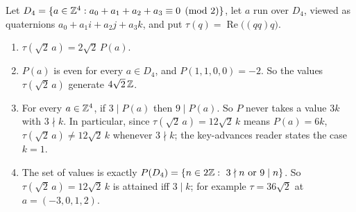 \begin{proposition}\label{prop:s65}
Let $D_4=\{a\in\mathbb{Z}^4:a_0+a_1+a_2+a_3\equiv0\pmod2\}$, let $a$ run over $D_4$, viewed as quaternions $a_0+a_1i+a_2j+a_3k$, and put $\tau(q)=\operatorname{Re}\bigl((qq)q\bigr)$.
\begin{enumerate}[label=\textup{(\alph*)}]
\item $\tau(\sqrt2\,a)=2\sqrt2\,P(a)$.
\item $P(a)$ is even for every $a\in D_4$, and $P(1,1,0,0)=-2$. So the values $\tau(\sqrt2\,a)$ generate $4\sqrt2\,\mathbb{Z}$.
\item For every $a\in\mathbb{Z}^4$, if $3\mid P(a)$ then $9\mid P(a)$. So $P$ never takes a value $3k$ with $3\nmid k$. In particular, since $\tau(\sqrt2\,a)=12\sqrt2\,k$ means $P(a)=6k$, $\tau(\sqrt2\,a)\neq12\sqrt2\,k$ whenever $3\nmid k$; the key-advances reader states the case $k=1$.
\item The set of values is exactly $P(D_4)=\{n\in2\mathbb{Z}:\ 3\nmid n\text{ or }9\mid n\}$. So $\tau(\sqrt2\,a)=12\sqrt2\,k$ is attained iff $3\mid k$; for example $\tau=36\sqrt2$ at $a=(-3,0,1,2)$.
\end{enumerate}
\end{proposition}

